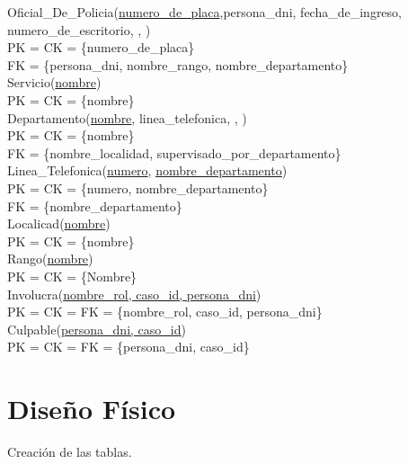 \documentclass[10pt,a4paper]{article}
\begin{document}
\newline
Oficial\_De\_Policia(\underline{numero\_de\_placa},persona\_dni, fecha\_de\_ingreso, numero\_de\_escritorio, , )\\
	PK = CK = \{numero\_de\_placa\}\\ 
	FK = \{persona\_dni, nombre\_rango, nombre\_departamento\}\\
\newline
Servicio(\underline{nombre})\\ 
	PK = CK = \{nombre\}\\ 
\newline
Departamento(\underline{nombre}, linea\_telefonica, , )\\ 
	PK = CK = \{nombre\}\\ 
	FK = \{nombre\_localidad, supervisado\_por\_departamento\}\\
\newline
Linea\_Telefonica(\underline{numero}, \underline{\underline{nombre\_departamento}})\\ 
	PK = CK = \{numero, nombre\_departamento\}\\ 
	FK = \{nombre\_departamento\}\\
\newline
Localicad(\underline{nombre})\\ 
	PK = CK = \{nombre\}\\ 
\newline
Rango(\underline{nombre})\\ 
	PK = CK = \{Nombre\}\\ 
\newline
Involucra(\underline{\underline{nombre\_rol, caso\_id, persona\_dni}})\\ 
	PK = CK = FK = \{nombre\_rol, caso\_id, persona\_dni\}\\ 
\newline
Culpable(\underline{\underline{persona\_dni, caso\_id}})\\ 
	PK = CK = FK = \{persona\_dni, caso\_id\}\\ 

\section{Diseño Físico}
Creación de las tablas.
\end{document}
